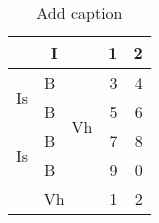 \begin{table}[htbp]
  \centering
  \caption{Add caption}
    \begin{tabular}{|c|r|c|r|r|}
    \hline
    \multicolumn{3}{|c|}{I} & 1     & 2 \\
    \hline
    \multirow{2}{*}{Is} & B     & \multirow{4}{*}{Vh} & 3     & 4 \\\cline{2-2}\cline{4-5}
    & B     &  & 5     & 6 \\\cline{1-2}\cline{4-5}
    \multirow{2}{*}{Is} & B     &  & 7     & 8 \\\cline{2-2}\cline{4-5}
    & B     &  & 9     & 0 \\\hline
    \multicolumn{3}{|c|}{Vh} & 1     & 2 \\
    \hline
    \end{tabular}%
  \label{tab:addlabel}%
\end{table}%
